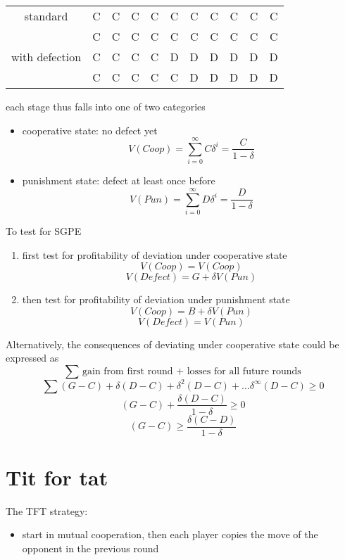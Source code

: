 \documentclass[a4paper, 10pt]{article}
\begin{document}
\begin{center}
   \begin{tabular}{c |c c c c c c c c c c}
      standard & C & C & C & C & C & C & C & C & C & C \\
               & C & C & C & C & C & C & C & C & C & C \\
     \hline
      with defection & C & C & C & C & D & D & D & D & D & D \\
                     & C & C & C & C & C & D & D & D & D & D \\
   \end{tabular}
\end{center}  


each stage thus falls into one of two categories
\begin{itemize}
   \item cooperative state: no defect yet
      \[
         V(Coop) = \sum_{i=0}^{\infty} C \delta^i = \frac{C}{1 - \delta}
      \]
   \item punishment state: defect at least once before
      \[
         V(Pun) = \sum_{i=0}^{\infty} D \delta^i = \frac{D}{1- \delta}
      \]
      
\end{itemize}	

To test for SGPE
\begin{enumerate}
   \item first test for profitability of deviation under cooperative state
         \[
         V(Coop) = V(Coop)
         \]
         \[
            V(Defect) = G + \delta V(Pun)
         \]
         
   \item then test for profitability of deviation under punishment state
      \[
         V(Coop) = B + \delta  V(Pun)
      \]
      \[
         V(Defect) = V(Pun)
      \]
      
\end{enumerate}	

Alternatively, the consequences of deviating under cooperative state could be expressed as 
\[
   \sum \text{ gain from first round + losses for all future rounds}
\]
\[
  \sum (G-C) + \delta (D-C) + \delta^2 (D-C) + ... \delta^{\infty} (D-C) \ge 0
\]
\[
 (G-C) + \frac{\delta (D-C)}{1 - \delta } \ge 0
\]
\[
   (G-C) \ge \frac{\delta (C-D)}{1 - \delta}
\]


\section{Tit for tat}
\begin{framed}
   The TFT strategy:
   \begin{itemize}
      \item start in mutual cooperation, then each player copies the move of the opponent in the previous round
   \end{itemize}	
\end{framed}	
\end{document}
